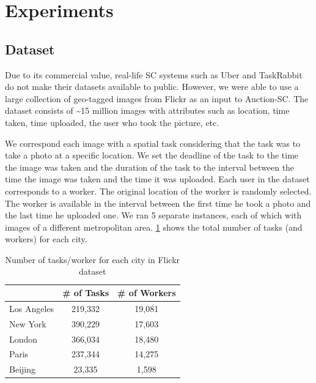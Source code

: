 \section{Experiments}
\label{sec:experiments}

\subsection{Dataset}
\label{subsec:dataset}
Due to its commercial value, real-life SC systems such as Uber and TaskRabbit do not make their datasets available to public. However, we were able to use a large collection of geo-tagged images from Flickr \cite{Thomee15} as an input to Auction-SC. The dataset consists of \textasciitilde 15 million images with attributes such as location, time taken, time uploaded, the user who took the picture, etc.

We correspond each image with a spatial task considering that the task was to take a photo at a specific location. We set the deadline of the task to the time the image was taken and the duration of the task to the interval between the time the image was taken and the time it was uploaded. Each user in the dataset corresponds to a worker. The original location of the worker is randomly selected. The worker is available in the interval between the first time he took a photo and the last time he uploaded one. We ran 5 separate instances, each of which with images of a different metropolitan area. \cref{tab:flickr_stats} shows the total number of tasks (and workers) for each city. 

\begin{table}[h]
\begin{center}
\begin{tabular}{| l || c | c |} \hline
			&	\# of Tasks	&	\# of Workers	\\ \hline
Los Angeles	&	219,332		&		19,081		\\ \hline
New York	&	390,229		&		17,603		\\ \hline
London		& 	366,034		&		18,480		\\ \hline
Paris		&	237,344		&		14,275		\\ \hline
Beijing		&	23,335		&		1,598		\\ \hline
\end{tabular}
\caption{\small{Number of tasks/worker for each city in Flickr dataset}}
\label{tab:flickr_stats}
\end{center}
\end{table}

